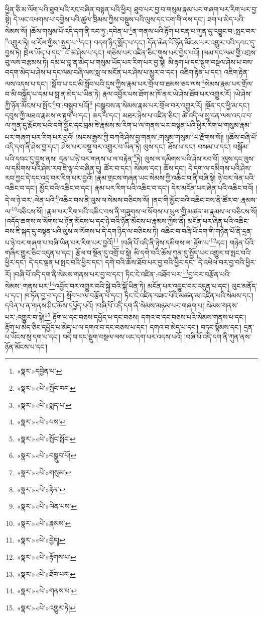 ཕྱིན་ཅི་མ་ལོག་པའི་ཐུབ་པའི་རང་བཞིན་བསྟན་པའི་ཕྱིར། ཐུབ་པར་བྱ་བ་གསུམ་རྣམ་པར་གཞག་པར་རིག་པར་བྱ་སྟེ། དེ་ཡང་འཕགས་པ་དགྱེས་པའི་ཚུལ་ཁྲིམས་ཀྱིས་བསྡུས་པའི་ལུས་དང་ངག་གི་ལས་དང་། ཟག་པ་མེད་པའི་སེམས་སོ། །ཆོས་གསུམ་པོ་འདི་དག་ནི་རབ་ཏུ་:དབེན་པ་\footnote{«སྣར་»དབྱེན་པ་}ན་གནས་པའི་རྟོག་པ་ངན་པ་ཀུན་དུ་འབྱུང་བ་:སྤང་བར་\footnote{«སྣར་»«པེ་»སྤོང་བར་}འགྱུར་ཏེ། ཕ་རོལ་གྱིས་:སྤྱད་པ་\footnote{«སྣར་»«པེ་»སྨད་པ་}དང་། བདག་ཉིད་སྨོད་པ་དང་། དོན་ཆེན་པོ་ཉོན་མོངས་པར་འགྱུར་བའི་དབང་དུ་བྱས་ཏེ། ཁྲེལ་ཡོད་པ་དང་། ངོ་ཚ་ཤེས་པ་དང་། གཅེས་པར་འཛིན་ཅིང་གུས་པར་བྱེད་པའོ། །ལམ་དང་ལམ་གྱི་འབྲས་བུ་ལས་བརྩམས་ཏེ། དམ་པ་བླ་ན་མེད་པ་གསུམ་ཡོད་པར་རིག་པར་བྱ་སྟེ། མི་རྟག་པ་དང་སྡུག་བསྔལ་ཤེས་པ་བས་བདག་མེད་པ་ཤེས་པ་དང་ལམ་བཞི་ལས་སླ་ལ་མངོན་པར་ཤེས་པ་མྱུར་བ་དང་། འཇིག་རྟེན་པ་དང་། འཇིག་རྟེན་ལས་འདས་པ་དང་། །སློབ་པ་དང་མི་སློབ་པའི་དུས་ཀྱིས་རྣམ་པར་གྲོལ་བ་ཐམས་ཅད་ལས་\footnote{«སྣར་»«པེ་»པས་}སེམས་རྣམ་པར་གྲོལ་བ་མི་བསྐྱོད་པ་དམ་པ་བླ་ན་མེད་པ་ཡིན་ཏེ། རྣལ་འབྱོར་པས་ཐོག་མ་ཁོ་ནར་ཡེ་ཤེས་ཐོབ་པར་འགྱུར་རོ། །ཡེ་ཤེས་ཀྱི་ཉོན་མོངས་པ་སྤོང་\footnote{«སྣར་»«པེ་»སྤོང་སྤོང་}བ་:བསྒྲུབ་པའོ།\footnote{«སྣར་»«པེ་»བསྒྲུབ་པོ།} །བསྒྲུབས་ན་སེམས་རྣམ་པར་གྲོལ་བར་འགྱུར་རོ། །སྔོན་དང་ཕྱི་མ་དང་། དབུས་ཀྱི་མཐའ་རྣམས་ལ་རྟག་པ་དང་། ཆད་པ་དང་། མཐར་ཉེས་པ་འཛིན་ཅིང་། ཚེ་འདི་ལ་མྱ་ངན་ལས་འདའ་བ་ལ་ཀུན་དུ་རྨོངས་པའི་དགེ་སྦྱོང་དང་བྲམ་ཟེ་རྣམས་མ་རིག་པ་ལ་གནས་པར་བསྟན་པའི་ཕྱིར་རིག་པ་གསུམ་རྣམ་པར་གཞག་པར་རིག་པར་བྱའོ། །སངས་རྒྱས་ཀྱི་བཀའི་ཤེས་བྱ་གནས་:གསུམ་གསུམ་\footnote{«སྣར་»«པེ་»གསུམ་}པ་རྫོགས་སོ།། །།ཆོས་བཞི་པོ་འདི་དག་ནི་ཤེས་བྱ་དང་། ཤེས་པར་བསྡུ་བར་འགྱུར་བ་ཡིན་ཏེ། ལུས་དང་། ཐོས་པ་དང་། བསམ་པ་དང་། བསྒོམ་པའི་དབང་དུ་བྱས་ནས། དྲན་པ་ཉེ་བར་གནས་པ་ལ་བརྟེན་\footnote{«སྣར་»«པེ་»རྟེན་}ཏེ། ལུས་ལ་དམིགས་པའི་ཤེས་རབ་བོ། །ལུས་དང་ལུས་ལ་དམིགས་པའི་ཤེས་རབ་ཇི་ལྟ་བ་བཞིན་དུ། ཚོར་བ་དང་། སེམས་དང་། ཆོས་དང་། དེ་དག་ལ་དམིགས་པའི་ཤེས་རབ་ཀྱང་དེ་དང་འདྲ་བར་རིག་པར་བྱའོ། །རྣམ་གྲངས་གཞན་ཡང་སེམས་ཀྱི་འཆིང་བ་ནི་བཞི་སྟེ། ཉེ་བར་ལེན་པའི་འཆིང་བ་དང་། མྱོང་བའི་འཆིང་བ་དང་། རྣམ་པར་རིག་པའི་འཆིང་བ་དང་། དེར་མངོན་པར་ཞེན་པའི་འཆིང་བའོ། །དེ་ལ་ཉེ་བར་:ལེན་པའི་\footnote{«སྣར་»«པེ་»ལེན་པས་}འཆིང་བས་ནི་ལུས་ལ་སེམས་བཅིངས་སོ། །ནང་གི་མྱོང་བའི་འཆིང་བས་ནི་ཚོར་བ་:རྣམས་ལ་\footnote{«སྣར་»«པེ་»རྣམས་}བཅིངས་སོ། །རྣམ་པར་རིག་པའི་འཆིང་བས་ནི་གཟུགས་ལ་སོགས་པ་ཡུལ་གྱི་མཚན་མ་རྣམས་ལ་བཅིངས་སོ། །འདོད་ཆགས་ལ་སོགས་པ་ཉོན་མོངས་པ་དང་ཉེ་བའི་ཉོན་མོངས་པ་རྣམས་ཀྱིས་ནི། མངོན་པར་ཞེན་པའི་འཆིང་བས་ཇི་སྐད་དུ་བསྟན་པའི་ལུས་ལ་སོགས་པ་དེ་དག་ཉིད་ལ་བཅིངས་ཏེ། འཆིང་བ་བཞི་པོ་དག་གི་གཉེན་པོ་ནི་དྲན་པ་ཉེ་བར་གཞག་པ་བཞི་ཡིན་པར་རིག་པར་བྱའོ།\footnote{«སྣར་»«པེ་»བྱེད།} །བཞི་པོ་འདི་ནི་ཉེས་དམིགས་ལ་:རྟོག་པ་\footnote{«སྣར་»«པེ་»རྟོགས་པ་}དང་། གཉེན་པོའི་གཞིར་གྱུར་ཅིང་འདུན་པ་དང་། རྩོལ་བ་སྔོན་དུ་འགྲོ་བ་སྟེ། མི་དགེ་བའི་ཆོས་ཀུན་དུ་སྤྱོད་པར་འགྱུར་བ་སྤང་བའི་ཕྱིར་དང་། དེ་དང་ལྡན་པ་སྤང་བའི་ཕྱིར་དང་། དགེ་བའི་ཆོས་ཐོབ་པར་བྱ་བའི་ཕྱིར་དང་། དེ་འཕེལ་བར་བྱ་བའི་ཕྱིར་རོ། །བཞི་པོ་འདི་དག་ནི་སེམས་གནས་པར་བྱ་བ་དང་། ཏིང་ངེ་འཛིན་:འཐོབ་པར་\footnote{«སྣར་»«པེ་»ཐོབ་པར་}བྱ་བར་བརྩོན་པའི་སེམས་:གནས་པར་\footnote{«སྣར་»«པེ་»གནས་པ་}འབྱོར་བར་འགྱུར་བའི་སྐྱེ་བའི་སྒོ་ཡིན་ཏེ། མངོན་པར་འབྱུང་བར་འདུན་པ་དང་། ལུང་མནོད་པ་དང་། ཁ་ཏོན་བྱ་བ་དང་། སློབ་པ་ལ་བརྩོན་པ་དང་། ཏིང་ངེ་འཛིན་བཟང་པོའི་མཚན་མ་འཛིན་པའི་སེམས་དང་། དབེན་པ་ན་གནས་ཤིང་ཆོས་དཔྱོད་པའོ། །བཞི་པོ་འདི་དག་ནི་སེམས་མཉམ་པར་གཞག་པ། སེམས་གནས་པར་:འགྱུར་བ་སྟེ།\footnote{«སྣར་»«པེ་»འགྱུར་ཏེ།} རྟོག་པ་དང་བཅས་དཔྱོད་པ་དང་བཅས། དགའ་བ་དང་བཅས་པའི་སེམས་གནས་པ་དང་། རྟོག་པ་མེད་ཅིང་དཔྱོད་པ་མེད་པ་ལ་དགའ་བ་དང་བཅས་པ་དང་། དགའ་བ་མེད་པ་དང་། བཏང་སྙོམས་དང་། དྲན་པ་ཡོངས་སུ་དག་པ་དང་། བདེ་བ་དང་སྡུག་བསྔལ་ལས་ཡང་དག་པར་འདས་པའོ། །བཞི་པོ་འདི་དག་ནི་ཀུན་ནས་ཉོན་མོངས་པ་དང་། 